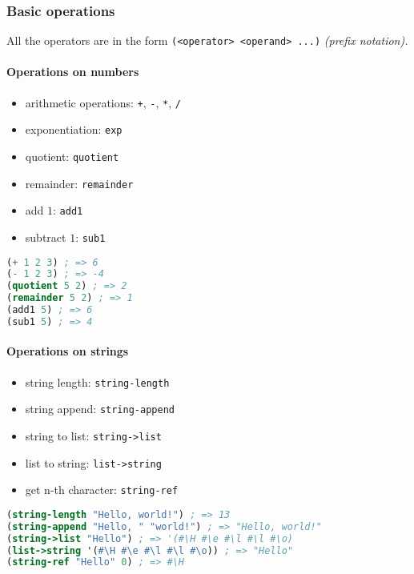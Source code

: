 \documentclass[a4paper,landscape,10pt]{article}
\begin{document}
\begin{multicols*}{2}
  \subsubsection{Basic operations}

  All the operators are in the form \texttt{(<operator> <operand> ...)} \textit{(prefix notation).}

  \paragraph{Operations on numbers}

  \begin{itemize}
    \item arithmetic operations: \texttt{+}, \texttt{-}, \texttt{*}, \texttt{/}
    \item exponentiation: \texttt{exp}
    \item quotient: \texttt{quotient}
    \item remainder: \texttt{remainder}
    \item add \(1\): \texttt{add1}
    \item subtract \(1\): \texttt{sub1}
  \end{itemize}

  \begin{lstlisting}[language=Scheme]
(+ 1 2 3) ; => 6
(- 1 2 3) ; => -4
(quotient 5 2) ; => 2
(remainder 5 2) ; => 1
(add1 5) ; => 6
(sub1 5) ; => 4
\end{lstlisting}

  \paragraph{Operations on strings}

  \begin{itemize}
    \item string length: \texttt{string-length}
    \item string append: \texttt{string-append}
    \item string to list: \texttt{string->list}
    \item list to string: \texttt{list->string}
    \item get n-th character: \texttt{string-ref}
  \end{itemize}

  \begin{lstlisting}[language=Scheme]
(string-length "Hello, world!") ; => 13
(string-append "Hello, " "world!") ; => "Hello, world!"
(string->list "Hello") ; => '(#\H #\e #\l #\l #\o)
(list->string '(#\H #\e #\l #\l #\o)) ; => "Hello"
(string-ref "Hello" 0) ; => #\H
\end{lstlisting}


\end{multicols*}
\end{document}
